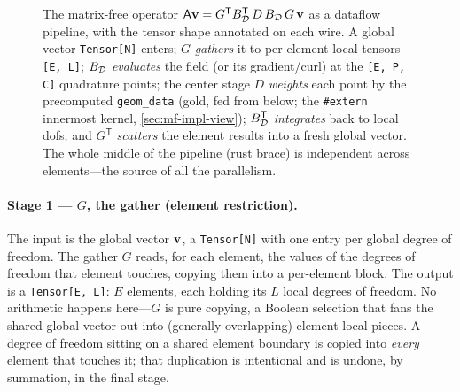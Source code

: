 \begin{figure}[p]
{%
}
\caption[The five-stage matrix-free pipeline]{The matrix-free operator
$\mathsf{A}\mathbf{v} = G^{\mathsf T}B_{\mathcal{D}}^{\mathsf T}\,D\,B_{\mathcal{D}}\,G\,\mathbf{v}$ as a
dataflow pipeline, with the tensor shape annotated on each wire. A global vector
\lstinline[style=l4style]|Tensor[N]| enters; $G$ \emph{gathers} it to per-element
local tensors \lstinline[style=l4style]|[E, L]|; $B_{\mathcal{D}}$ \emph{evaluates}
the field (or its gradient/curl) at the \lstinline[style=l4style]|[E, P, C]|
quadrature points; the center stage $D$ \emph{weights} each point by the
precomputed \texttt{geom\_data} (gold, fed from below; the
\lstinline[style=l4style]|#extern| innermost kernel, \cref{sec:mf-impl-view});
$B_{\mathcal{D}}^{\mathsf T}$ \emph{integrates} back to local dofs; and $G^{\mathsf T}$
\emph{scatters} the element results into a fresh global vector. The whole middle
of the pipeline (rust brace) is independent across elements---the source of all
the parallelism.}
\label{fig:mf-pipeline}
\end{figure}

\paragraph{Stage 1 --- $G$, the gather (element restriction).}
The input is the global vector $\mathbf{v}$, a \lstinline[style=l4style]|Tensor[N]| with
one entry per global degree of freedom. The gather $G$ reads, for each element,
the values of the degrees of freedom that element touches, copying them into a
per-element block. The output is a \lstinline[style=l4style]|Tensor[E, L]|: $E$
elements, each holding its $L$ local degrees of freedom. No arithmetic happens
here---$G$ is pure copying, a Boolean selection that fans the shared global
vector out into (generally overlapping) element-local pieces. A degree of freedom
sitting on a shared element boundary is copied into \emph{every} element that
touches it; that duplication is intentional and is undone, by summation, in the
final stage.

